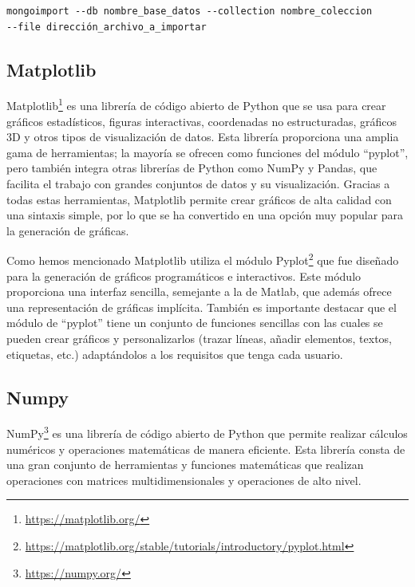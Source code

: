\documentclass[a4paper, 12pt]{book}
\begin{document}
\begin{verbatim}
mongoimport --db nombre_base_datos --collection nombre_coleccion
--file dirección_archivo_a_importar
\end{verbatim}

\subsection{Matplotlib} %
\label{sec:matplotlib} %

Matplotlib\footnote{\url{https://matplotlib.org/}} es una librería de código abierto de Python que se usa para crear gráficos estadísticos, figuras interactivas, coordenadas no estructuradas, gráficos 3D y otros tipos de visualización de datos.
Esta librería proporciona una amplia gama de herramientas; la mayoría se ofrecen como funciones del módulo ``pyplot'', pero también integra otras librerías de Python como NumPy y Pandas, que facilita el trabajo con grandes conjuntos de datos y su visualización.
Gracias a todas estas herramientas, Matplotlib permite crear gráficos de alta calidad con una sintaxis simple, por lo que se ha convertido en una opción muy popular para la generación de gráficas.


Como hemos mencionado Matplotlib utiliza el módulo Pyplot\footnote{\url{https://matplotlib.org/stable/tutorials/introductory/pyplot.html}} que fue diseñado para la generación de gráficos programáticos e interactivos.
Este módulo proporciona una interfaz sencilla, semejante a la de Matlab, que además ofrece una representación de gráficas implícita.
También es importante destacar que el módulo de ``pyplot'' tiene un conjunto de funciones sencillas con las cuales se pueden crear gráficos y personalizarlos (trazar líneas, añadir elementos, textos, etiquetas, etc.) adaptándolos a los requisitos que tenga cada usuario. 

 
\subsection{Numpy} %
\label{sec:numpy} %

NumPy\footnote{\url{https://numpy.org/}} es una librería de código abierto de Python que permite realizar cálculos numéricos y operaciones matemáticas de manera eficiente.
Esta librería consta de una gran conjunto de herramientas y funciones matemáticas que realizan operaciones con matrices multidimensionales y operaciones de alto nivel.  
\end{document}
